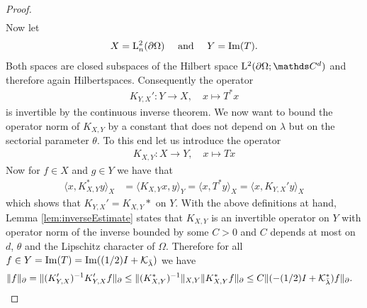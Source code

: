 \begin{proof}
\begin{align*}
  \end{align*}
  Now let 
  \begin{align*}
    X = \mathrm{L}^2_n(\partial\Omega)\quad\text{ and }\quad Y = \operatorname{Im}(T).
  \end{align*}
  Both spaces are closed subspaces of the Hilbert space $\Ell^2(\partial\Omega; \C^d)$ and therefore again Hilbertspaces.
  Consequently the operator
  \begin{align*}
    K_{Y,X}' \colon Y \to X, \quad x \mapsto T^* x
  \end{align*}
  is invertible by the continuous inverse theorem.
  We now want to bound the operator norm of $K_{X,Y}$ by a constant that does not depend on $\lambda$ but on the sectorial parameter $\theta$.
  To this end let us introduce the operator
  \begin{align*}
    K_{X,Y} \colon X \to Y, \quad x \mapsto T x
  \end{align*}
  Now for $f \in X$ and $g \in Y$ we have that
  \begin{align*}
    \langle x, K_{X,Y}^* y \rangle_X
    & = \langle K_{X,Y} x, y \rangle_Y
    =  \langle x, T^*y \rangle_X
    = \langle x, K_{Y,X}' y \rangle_X
  \end{align*}
  which shows that $K_{Y,X}' = K_{X,Y}*$ on $Y$.
  With the above definitions at hand, Lemma \ref{lem:inverseEstimate} states that $K_{X,Y}$ is an invertible operator on $Y$ with operator norm of the inverse bounded by some $C > 0$ and $C$ depends at most on $d$, $\theta$ and the Lipschitz character of $\Omega$.
  Therefore for all $f \in Y = \operatorname{Im}(T) = \operatorname{Im}((1/2)I + \mathcal{K}_{\bar \lambda})$ we have
  \begin{align}
    \label{eq:dualityArgument}
    \| f\|_\partial &= \| (K_{Y,X}')^{-1} K_{Y,X}' f \|_\partial
    \leq  \| (K_{X,Y}^*)^{-1} \|_{X,Y} \| K_{X,Y}^* f\|_\partial
    \leq C \|(-(1/2)I + \mathcal{K}_{\bar \lambda}^*)f \|_\partial.
  \end{align}


\end{proof}
